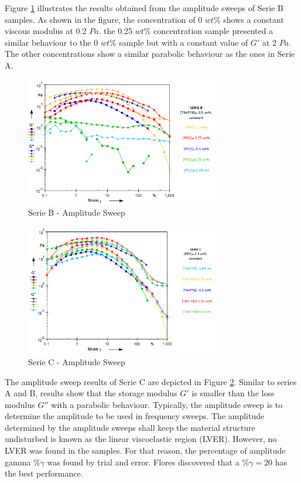 Figure \ref{fig:SerieBampSweep} illustrates the results obtained from the amplitude sweeps of Serie B samples. As shown in the figure, the concentration of 0 $w t \%$ shows a constant viscous modulus at 0.2 $Pa$. the 0.25 $w t \%$ concentration sample presented a similar behaviour to the 0 $w t \%$ sample but with a constant value of $G'$ at 2 $Pa$. The other concentrations show a similar parabolic behaviour as the ones in Serie A.

\begin{figure}[th]
\centering
\includegraphics[width=0.75\textwidth]{./Figures/SerieBampSweep.png}
\decoRule
\caption[Serie B - Amplitude Sweep]{Serie B - Amplitude Sweep}
\label{fig:SerieBampSweep}
\end{figure}

\begin{figure}[th]
\centering
\includegraphics[width=0.75\textwidth]{./Figures/SerieCampSweep.png}
\decoRule
\caption[Serie C - Amplitude Sweep]{Serie C - Amplitude Sweep}
\label{fig:SerieCampSweep}
\end{figure}

The amplitude sweep results of Serie C are depicted in Figure \ref{fig:SerieCampSweep}. Similar to series A and B, results show that the storage modulus $G'$ is smaller than the loss modulus $G''$ with a parabolic behaviour. Typically, the amplitude sweep is to determine the amplitude to be used in frequency sweeps. The amplitude determined by the amplitude sweeps shall keep the material structure undisturbed is known as the linear viscoelastic region (LVER). However, no LVER was found in the samples. For that reason, the percentage of amplitude gamma $\% \gamma$ was found by trial and error. Flores discovered that a $\% \gamma = 20$ has the best performance. 

